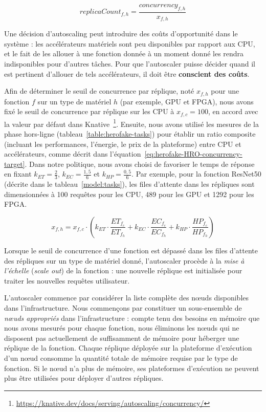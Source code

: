 \begin{equation}
    replicaCount_{f, h} = \frac{concurrency_{f, h}}{x_{f, h}}
\label{eq:herofake-HRO-replica-count}
\end{equation}

Une décision d'autoscaling peut introduire des coûts d'opportunité dans le système : les accélérateurs matériels sont peu disponibles par rapport aux CPU, et le fait de les allouer à une fonction donnée à un moment donné les rendra indisponibles pour d'autres tâches. Pour que l'autoscaler puisse décider quand il est pertinent d'allouer de tels accélérateurs, il doit être \textbf{conscient des coûts}.

Afin de déterminer le seuil de concurrence par réplique, noté $x_{f, h}$ pour une fonction $f$ sur un type de matériel $h$ (par exemple, GPU et FPGA), nous avons fixé le seuil de concurrence par réplique sur les CPU à $x_{f, c} = 100$, en accord avec la valeur par défaut dans Knative~\footnote{\href{https://knative.dev/docs/serving/autoscaling/concurrency/}{https://knative.dev/docs/serving/autoscaling/concurrency/}}. Ensuite, nous avons utilisé les mesures de la phase hors-ligne (tableau~\ref{table:herofake-tasks}) pour établir un ratio composite (incluant les performances, l'énergie, le prix de la plateforme) entre CPU et accélérateurs, comme décrit dans l'équation~\ref{eq:herofake-HRO-concurrency-target}. Dans notre politique, nous avons choisi de favoriser le temps de réponse en fixant $k_{ET} = \frac{2}{3}$, $k_{EC} = \frac{1,5}{6}$ et $k_{HP} = \frac{0,5}{6}$. Par exemple, pour la fonction ResNet50 (décrite dans le tableau~\ref{model:tasks}), les files d'attente dans les répliques sont dimensionnées à 100 requêtes pour les CPU, 489 pour les GPU et 1292 pour les FPGA.

\begin{equation}
    x_{f, h} = x_{f, c} \cdot (k_{ET} \cdot \frac{ET_{{f}_{c}}}{ET_{{f}_{h}}} + k_{EC} \cdot \frac{EC_{{f}_{c}}}{EC_{{f}_{h}}} + k_{HP} \cdot \frac{HP_{{f}_{c}}}{HP_{{f}_{h}}})
\label{eq:herofake-HRO-concurrency-target}
\end{equation}

Lorsque le seuil de concurrence d'une fonction est dépassé dans les files d'attente des répliques sur un type de matériel donné, l'autoscaler procède à la \textit{mise à l'échelle} (\textit{scale out}) de la fonction : une nouvelle réplique est initialisée pour traiter les nouvelles requêtes utilisateur.

L'autoscaler commence par considérer la liste complète des nœuds disponibles dans l'infrastructure. Nous commençons par constituer un sous-ensemble de \textit{nœuds appropriés} dans l'infrastructure : compte tenu des besoins en mémoire que nous avons mesurés pour chaque fonction, nous éliminons les nœuds qui ne disposent pas actuellement de suffisamment de mémoire pour héberger une réplique de la fonction. Chaque réplique déployée sur la plateforme d'exécution d'un nœud consomme la quantité totale de mémoire requise par le type de fonction. Si le nœud n'a plus de mémoire, ses plateformes d'exécution ne peuvent plus être utilisées pour déployer d'autres répliques.

